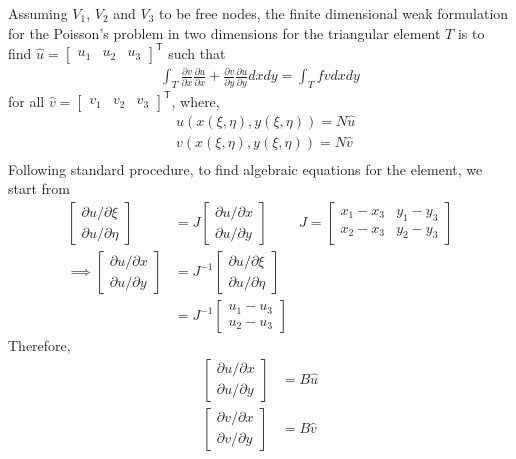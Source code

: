 \documentclass{article}
\newcommand{\pder}[2]{\frac{\partial #1}{\partial #2}}
\begin{document}
Assuming $V_1$, $V_2$ and $V_3$ to be free nodes,
the finite dimensional weak formulation
for the Poisson's problem in two dimensions
for the triangular element $T$
is to find $\hat{u} = \begin{bmatrix} u_1 & u_2 & u_3 \end{bmatrix}^{\mathsf{T}}$
such that
\begin{align}
	\int_T \pder{v}{x}\pder{u}{x} + \pder{v}{y}\pder{u}{y} dxdy = \int_T fv dxdy \label{weak}
\end{align}
for all $\hat{v} = \begin{bmatrix} v_1 & v_2 & v_3 \end{bmatrix}^{\mathsf{T}}$,
where,
\begin{align*}
	& u(x(\xi,\eta), y(\xi,\eta)) = N \hat{u} \\
	& v(x(\xi,\eta), y(\xi,\eta)) = N \hat{v} \\
\end{align*}
Following standard procedure,
to find algebraic equations for the element,
we start from
\begin{align*}
	\begin{bmatrix} {\partial u}/{\partial \xi} \\ {\partial u}/{\partial \eta} \end{bmatrix}
		& = J \begin{bmatrix} {\partial u}/{\partial x} \\ {\partial u}/{\partial y} \end{bmatrix} 
			& J = \begin{bmatrix} x_1 - x_3 & y_1 - y_3 \\ x_2 - x_3 & y_2 - y_3 \end{bmatrix} \\
	\implies \begin{bmatrix} {\partial u}/{\partial x} \\ {\partial u}/{\partial y} \end{bmatrix}
		& = J^{-1} \begin{bmatrix} {\partial u}/{\partial \xi} \\ {\partial u}/{\partial \eta} \end{bmatrix} \\
		& = J^{-1} \begin{bmatrix} u_1 - u_3 \\ u_2 - u_3 \end{bmatrix}
\end{align*}
Therefore,
\begin{align}
	\begin{bmatrix} {\partial u}/{\partial x} \\ {\partial u}/{\partial y} \end{bmatrix}
		&= B \hat{u} \label{ugrad} \\ 
	\begin{bmatrix} {\partial v}/{\partial x} \\ {\partial v}/{\partial y} \end{bmatrix}
		&= B \hat{v} \label{vgrad} \\ 
\end{align}
\end{document}
